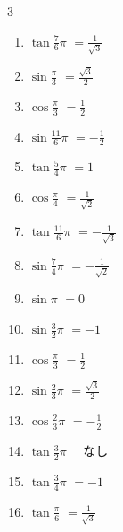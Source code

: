 \begin{multicols}{3}
\begin{enumerate}
  \item $\displaystyle \tan{\frac{7}{6}\pi}$
        $\displaystyle =\frac{1}{\sqrt{3}}$

  \item $\displaystyle \sin{\frac{\pi}{3}}$
        $\displaystyle =\frac{\sqrt{3}}{2}$

  \item $\displaystyle \cos{\frac{\pi}{3}}$
        $\displaystyle =\frac{1}{2}$

  \item $\displaystyle \sin{\frac{11}{6}\pi}$
        $\displaystyle =-\frac{1}{2}$

  \item $\displaystyle \tan{\frac{5}{4}\pi}$
        $\displaystyle =1$

  \item $\displaystyle \cos{\frac{\pi}{4}}$
        $\displaystyle =\frac{1}{\sqrt{2}}$

  \item $\displaystyle \tan{\frac{11}{6}\pi}$
        $\displaystyle =-\frac{1}{\sqrt{3}}$

  \item $\displaystyle \sin{\frac{7}{4}\pi}$
        $\displaystyle =-\frac{1}{\sqrt{2}}$

  \item $\displaystyle \sin{\pi}$
        $\displaystyle =0$

  \item $\displaystyle \sin{\frac{3}{2}\pi}$
        $\displaystyle =-1$

  \item $\displaystyle \cos{\frac{\pi}{3}}$
        $\displaystyle =\frac{1}{2}$

  \item $\displaystyle \sin{\frac{2}{3}\pi}$
        $\displaystyle =\frac{\sqrt{3}}{2}$

  \item $\displaystyle \cos{\frac{2}{3}\pi}$
        $\displaystyle =-\frac{1}{2}$

  \item $\displaystyle \tan{\frac{3}{2}\pi}$
        $\displaystyle \quad なし$

  \item $\displaystyle \tan{\frac{3}{4}\pi}$
        $\displaystyle =-1$

\columnbreak %

  \item $\displaystyle \tan{\frac{\pi}{6}}$
        $\displaystyle =\frac{1}{\sqrt{3}}$


\end{enumerate}
\end{multicols}
